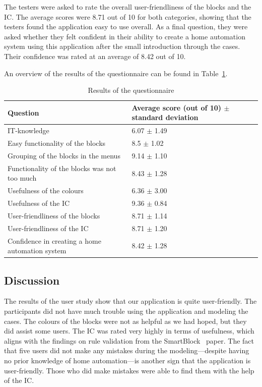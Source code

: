 \documentclass[11pt,a4paper]{report}
\begin{document}
The testers were asked to rate the overall user-friendliness of the blocks and the IC. The average scores were 8.71 out of 10 for both categories, showing that the testers found the application easy to use overall. As a final question, they were asked whether they felt confident in their ability to create a home automation system using this application after the small introduction through the cases. Their confidence was rated at an average of 8.42 out of 10.

An overview of the results of the questionnaire can be found in Table~\ref{tab:questionnaire_results}.

\begin{table}
    \centering
    \begin{tabular}{|l|l|}
        \hline
        Question & Average score (out of 10) $\pm$ standard deviation\\
        \hline
        IT-knowledge & 6.07 $\pm$ 1.49 \\
        Easy functionality of the blocks & 8.5 $\pm$ 1.02 \\
        Grouping of the blocks in the menus & 9.14 $\pm$ 1.10 \\
        Functionality of the blocks was not too much & 8.43 $\pm$ 1.28 \\
        Usefulness of the colours & 6.36 $\pm$ 3.00\\
        Usefulness of the IC & 9.36 $\pm$ 0.84\\
        User-friendliness of the blocks & 8.71 $\pm$ 1.14 \\
        User-friendliness of the IC & 8.71 $\pm$ 1.20\\
        Confidence in creating a home automation system & 8.42 $\pm$ 1.28 \\
        \hline
    \end{tabular}
    \caption{Results of the questionnaire}
    \label{tab:questionnaire_results}
\end{table}

\subsection{Discussion}
The results of the user study show that our application is quite user-friendly. The participants did not have much trouble using the application and modeling the cases. The colours of the blocks were not as helpful as we had hoped, but they did assist some users. The IC was rated very highly in terms of usefulness, which aligns with the findings on rule validation from the SmartBlock~\cite{SOTA_SmartBlock} paper. The fact that five users did not make any mistakes during the modeling—despite having no prior knowledge of home automation—is another sign that the application is user-friendly. Those who did make mistakes were able to find them with the help of the IC.
\end{document}
